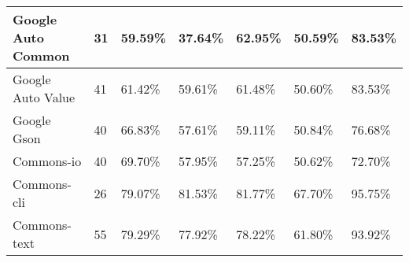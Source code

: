 \documentclass[../../main]{subfiles}
\begin{document}
\begin{table}[!htb]
\begin{tabular}{|l|l|l|l|l|l|l|}
Google Auto   Common  & 31                   & 59.59\%                           & 37.64\%                                                & 62.95\%                            & 50.59\%                                                                                                                                    & 83.53\%                                                                                                                                    \\ \hline
Google Auto   Value   & 41                   & 61.42\%                           & 59.61\%                                                & 61.48\%                            & 50.60\%                                                                                                                                    & 83.53\%                                                                                                                                    \\ \hline
Google Gson           & 40                   & 66.83\%                           & 57.61\%                                                & 59.11\%                            & 50.84\%                                                                                                                                    & 76.68\%                                                                                                                                    \\ \hline
Commons-io            & 40                   & 69.70\%                           & 57.95\%                                                & 57.25\%                            & 50.62\%                                                                                                                                    & 72.70\%                                                                                                                                    \\ \hline
Commons-cli           & 26                   & 79.07\%                           & 81.53\%                                                & 81.77\%                            & 67.70\%                                                                                                                                    & 95.75\%                                                                                                                                    \\ \hline
Commons-text          & 55                   & 79.29\%                           & 77.92\%                                                & 78.22\%                            & 61.80\%                                                                                                                                    & 93.92\%                                                                                                                                    \\ \hline

\end{tabular}
\end{table}
\end{document}
